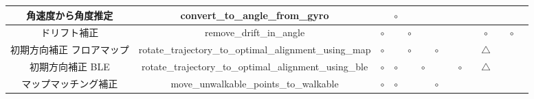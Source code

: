 \begin{table}[ht]
{\begin{tabular}{|c|c|c|c|c|c|c|c|c|c|c|c|c|c|}
			角速度から角度推定     & convert\_to\_angle\_from\_gyro                                      &                              & \multicolumn{1}{c|}{$\circ$} &                              &                              &                              &                                                                                                               &                              &                           &                                  &    &                              &    \\ \hline
			ドリフト補正        & remove\_drift\_in\_angle                                            & \multicolumn{1}{c|}{$\circ$} &                              & \multicolumn{1}{c|}{$\circ$} &                              &                              &                                                                                                               &                              &                           & \multicolumn{1}{c|}{$\circ$}     &    & \multicolumn{1}{c|}{$\circ$} &    \\ \hline
			初期方向補正 フロアマップ & rotate\_trajectory\_to\_optimal\_alignment\_using\_map              & \multicolumn{1}{c|}{$\circ$} &                              & \multicolumn{1}{c|}{$\circ$} &                              & \multicolumn{1}{c|}{$\circ$} &                                                                                                               &                              &                           & \multicolumn{1}{c|}{$\triangle$} &    &                              &    \\ \hline
			初期方向補正 BLE    & rotate\_trajectory\_to\_optimal\_alignment\_using\_ble              & \multicolumn{1}{c|}{$\circ$} & \multicolumn{1}{c|}{$\circ$} &                              & \multicolumn{1}{c|}{$\circ$} &                              &                                                                                                               & \multicolumn{1}{c|}{$\circ$} &                           & \multicolumn{1}{c|}{$\triangle$} &    &                              &    \\ \hline
			マップマッチング補正    & move\_unwalkable\_points\_to\_walkable                              & \multicolumn{1}{c|}{$\circ$} & \multicolumn{1}{c|}{$\circ$} &                              &                              & \multicolumn{1}{c|}{$\circ$} &                                                                                                               &                              &                           &                                  &    &                              &    \\ \hline

\end{tabular}}
\end{table}
